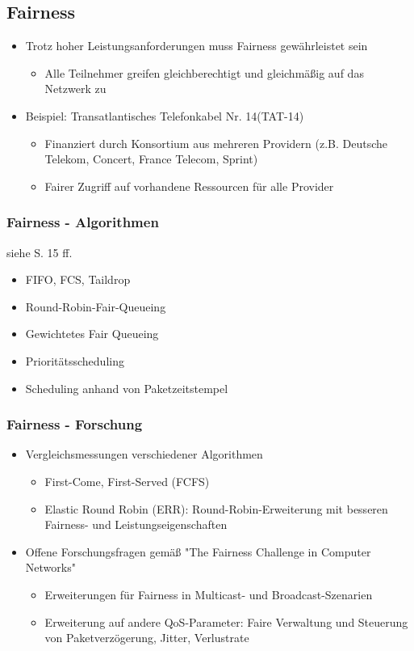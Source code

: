 \subsection{Fairness}
\begin{itemize}
	\item Trotz hoher Leistungsanforderungen muss Fairness gewährleistet sein
	\begin{itemize}
		\item Alle Teilnehmer greifen gleichberechtigt und gleichmäßig auf das Netzwerk zu
	\end{itemize}
	\item Beispiel: Transatlantisches Telefonkabel Nr. 14(TAT-14)
	\begin{itemize}
		\item Finanziert durch Konsortium aus mehreren Providern (z.B. Deutsche Telekom, Concert, France Telecom, Sprint)
		\item Fairer Zugriff auf vorhandene Ressourcen für alle Provider
	\end{itemize}
\end{itemize}
\subsubsection{Fairness - Algorithmen}
siehe S. 15 ff.
\begin{itemize}
	\item FIFO, FCS, Taildrop
	\item Round-Robin-Fair-Queueing
	\item Gewichtetes Fair Queueing
	\item Prioritätsscheduling
	\item Scheduling anhand von Paketzeitstempel
\end{itemize}
\subsubsection{Fairness - Forschung}
\begin{itemize}
	\item Vergleichsmessungen verschiedener Algorithmen
	\begin{itemize}
		\item First-Come, First-Served (FCFS)
		\item Elastic Round Robin (ERR): Round-Robin-Erweiterung mit besseren Fairness- und Leistungseigenschaften
	\end{itemize}
	\item Offene Forschungsfragen gemäß "The Fairness Challenge in Computer Networks"
	\begin{itemize}
		\item Erweiterungen für Fairness in Multicast- und Broadcast-Szenarien
		\item Erweiterung auf andere QoS-Parameter: Faire Verwaltung und Steuerung von Paketverzögerung, Jitter, Verlustrate
	\end{itemize}
\end{itemize}
